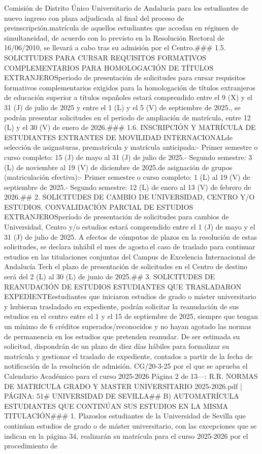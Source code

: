 \documentclass{article}
\begin{document}
\begin{itemize}
Comisión de Distrito Único Universitario de Andalucía para los estudiantes de nuevo ingreso con plaza adjudicada al final del proceso de preinscripción.\n\nLa matrícula de aquellos estudiantes que accedan en régimen de simultaneidad, de acuerdo con lo previsto en la Resolución Rectoral de 16/06/2010, se llevará a cabo tras su admisión por el Centro.\n\n### 1.5. SOLICITUDES PARA CURSAR REQUISITOS FORMATIVOS COMPLEMENTARIOS PARA HOMOLOGACIÓN DE TÍTULOS EXTRANJEROS\n\nEl periodo de presentación de solicitudes para cursar requisitos formativos complementarios exigidos para la homologación de títulos extranjeros de educación superior a títulos españoles estará comprendido entre el 9 (X) y el 31 (J) de julio de 2025 y entre el 1 (L) y el 5 (V) de septiembre de 2025.\n\nIgualmente, se podrán presentar solicitudes en el periodo de ampliación de matrícula, entre 12 (L) y el 30 (V) de enero de 2026.\n\n### 1.6. INSCRIPCIÓN Y MATRÍCULA DE ESTUDIANTES ENTRANTES DE MOVILIDAD INTERNACIONAL\n\nFechas de selección de asignaturas, prematrícula y matrícula anticipada:\n- Primer semestre o curso completo: 15 (J) de mayo al 31 (J) de julio de 2025.\n- Segundo semestre: 3 (L) de noviembre al 19 (V) de diciembre de 2025.\n\nFecha de asignación de grupos (matriculación efectiva):\n- Primer semestre o curso completo: 1 (L) al 19 (V) de septiembre de 2025.\n- Segundo semestre: 12 (L) de enero al 13 (V) de febrero de 2026.\n\n## 2. SOLICITUDES DE CAMBIO DE UNIVERSIDAD, CENTRO Y/O ESTUDIOS. CONVALIDACIÓN PARCIAL DE ESTUDIOS EXTRANJEROS\n\nEl período de presentación de solicitudes para cambios de Universidad, Centro y/o estudios estará comprendido entre el 1 (J) de mayo y el 31 (J) de julio de 2025. A efectos de cómputos de plazos en la resolución de estas solicitudes, se declara inhábil el mes de agosto.\n\nEn el caso de traslado para continuar estudios en las titulaciones conjuntas del Campus de Excelencia Internacional de Andalucía Tech el plazo de presentación de solicitudes en el Centro de destino será del 2 (L) al 30 (L) de junio de 2025.\n\n## 3. SOLICITUDES DE REANUDACIÓN DE ESTUDIOS ESTUDIANTES QUE TRASLADARON EXPEDIENTE\n\nLos estudiantes que iniciaron estudios de grado o máster universitario y hubieran trasladado su expediente, podrán solicitar la reanudación de sus estudios en el centro entre el 1 y el 15 de septiembre de 2025, siempre que tengan un mínimo de 6 créditos superados/reconocidos y no hayan agotado las normas de permanencia en los estudios que pretenden reanudar. De ser estimada su solicitud, dispondrán de un plazo de diez días hábiles para formalizar su matrícula y gestionar el traslado de expediente, contados a partir de la fecha de notificación de la resolución de admisión.\n{} CG/20-3-25 por el que se aprueba el Calendario Académico para el curso 2025-2026  Página 2 de 13\n\n---\n\nFUENTE: R.R. NORMAS DE MATRICULA GRADO Y MASTER UNIVERSITARIO 2025-2026.pdf | PÁGINA: 51\n# UNIVERSIDAD DE SEVILLA\n\n## B) AUTOMATRÍCULA ESTUDIANTES QUE CONTINÚAN SUS ESTUDIOS EN LA MISMA TITULACIÓN\n\n### 1. Plazos\n\nTodos los estudiantes de la Universidad de Sevilla que continúan estudios de grado o de máster universitario, con las excepciones que se indican en la página 34, realizarán su matrícula para el curso 2025-2026 por el procedimiento de 
\end{itemize}
\end{document}
